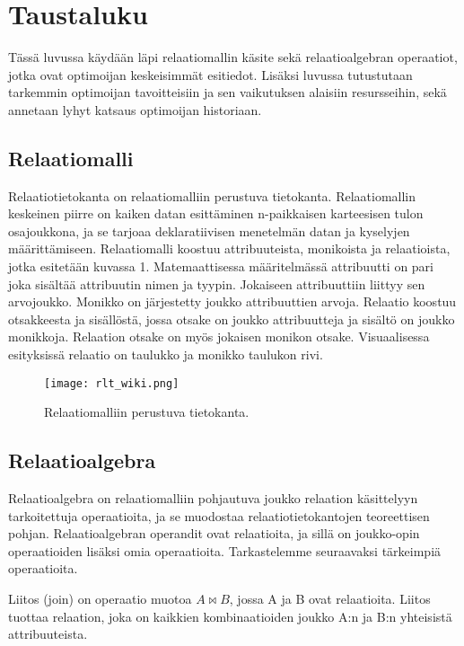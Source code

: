 \documentclass[finnish]{tktltiki2}
\theoremstyle{definition}
\theoremstyle{remark}
\begin{document}
\section{Taustaluku}
Tässä luvussa käydään läpi relaatiomallin käsite sekä relaatioalgebran operaatiot, jotka ovat optimoijan keskeisimmät esitiedot. Lisäksi luvussa tutustutaan tarkemmin optimoijan tavoitteisiin ja sen vaikutuksen alaisiin resursseihin, sekä annetaan lyhyt katsaus optimoijan historiaan.
\subsection{Relaatiomalli}
Relaatiotietokanta on relaatiomalliin \cite{codd1970relational} perustuva tietokanta. Relaatiomallin keskeinen piirre on kaiken datan esittäminen n-paikkaisen karteesisen tulon osajoukkona, ja se tarjoaa deklaratiivisen menetelmän datan ja kyselyjen määrittämiseen. Relaatiomalli koostuu attribuuteista, monikoista ja relaatioista, jotka esitetään kuvassa 1. Matemaattisessa määritelmässä attribuutti on pari joka sisältää attribuutin nimen ja tyypin. Jokaiseen attribuuttiin liittyy sen arvojoukko. Monikko on järjestetty joukko attribuuttien arvoja. Relaatio koostuu otsakkeesta ja sisällöstä, jossa otsake on joukko attribuutteja ja sisältö on joukko monikkoja. Relaation otsake on myös jokaisen monikon otsake. Visuaalisessa esityksissä relaatio on taulukko ja monikko taulukon rivi. 

\begin{figure}[!h] %
  \caption{Relaatiomalliin perustuva tietokanta.}
  \centering
    \texttt{[image: rlt\_wiki.png]}
\end{figure}

\subsection{Relaatioalgebra}
Relaatioalgebra on relaatiomalliin pohjautuva joukko relaation käsittelyyn tarkoitettuja operaatioita, ja se muodostaa relaatiotietokantojen teoreettisen pohjan. Relaatioalgebran operandit ovat relaatioita, ja sillä on joukko-opin operaatioiden lisäksi omia operaatioita. Tarkastelemme seuraavaksi tärkeimpiä operaatioita.

Liitos (join) on operaatio muotoa $A\bowtie B$, jossa A ja B ovat relaatioita. Liitos tuottaa relaation, joka on kaikkien kombinaatioiden joukko A:n ja B:n yhteisistä attribuuteista. %
\end{document}
